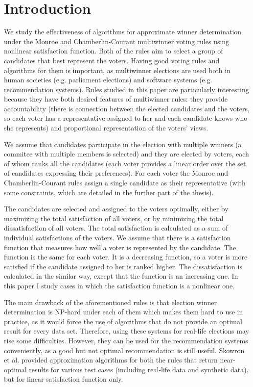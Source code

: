\chapter{Introduction}
\label{cha:introduction}

We study the effectiveness of algorithms for approximate winner determination under the Monroe and Chamberlin-Courant multiwinner voting rules using nonlinear satisfaction function. Both of the rules aim to select a group of candidates that best represent the voters. Having good voting rules and algorithms for them is important, as multiwinner elections are used both in human societies (e.g. parliament elections) and software systems (e.g. recommendation systems). Rules studied in this paper are particularly interesting because they have both desired features of multiwinner rules: they provide accountability (there is connection between the elected candidates and the voters, so each voter has a representative assigned to her and each candidate knows who she represents) and proportional representation of the voters’ views.

We assume that candidates participate in the election with multiple winners (a commitee with multiple members is selected) and they are elected by voters, each of whom ranks all the candidates (each voter provides a linear order over the set of candidates expressing their preferences). For each voter the Monroe and Chamberlin-Courant rules assign a single candidate as their representative (with some constraints, which are detailed in the further part of the thesis).

The candidates are selected and assigned to the voters optimally, either by maximizing the total satisfaction of all voters, or by minimizing the total dissatisfaction of all voters.
The total satisfaction is calculated as a sum of individual satisfactions of the voters. We assume that there is a  satisfaction function that measures how well a voter is represented by the candidate. The function is the same for each voter. It is a decreasing function, so a voter is more satisfied if the candidate assigned to her is ranked higher. The dissatisfaction is calculated in the similar way, except that the function is an increasing one. In this paper I study cases in which the satisfaction function is a nonlinear one.

The main drawback of the aforementioned rules is that election winner determination is NP-hard under each of them \cite{2} which makes them hard to use in practice, as it would force the use of algorithms that do not provide an optimal result for every data set. Therefore, using these systems for real-life elections may rise some difficulties. However, they can be used for the recommendation systems conveniently, as a good but not optimal recommendation is still useful. Skowron et al. \cite{1} provided approximation algorithms for both the rules that return near-optimal results for various test cases (including real-life data and synthetic data), but for linear satisfaction function only.

